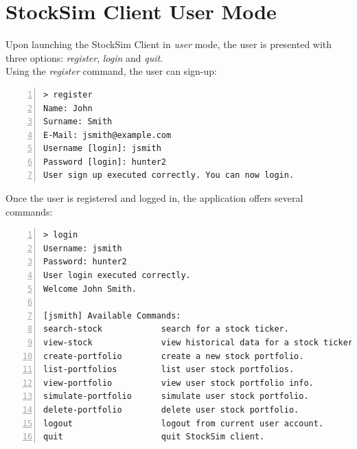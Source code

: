 \section{StockSim Client User Mode}
Upon launching the StockSim Client in \textit{user} mode, the user is presented
with three options: \textit{register}, \textit{login} and \textit{quit}.\\
Using the \textit{register} command, the user can sign-up:
\vspace{0.2cm}
\begin{lstlisting}[basicstyle=\footnotesize\ttfamily,language={},numbers=left,keepspaces=true,tabsize=4,
numberstyle=\footnotesize,numbersep=8pt,frame=single]
> register
Name: John
Surname: Smith
E-Mail: jsmith@example.com
Username [login]: jsmith
Password [login]: hunter2
User sign up executed correctly. You can now login.
\end{lstlisting}
\vspace{-0.5cm}
Once the user is registered and logged in, the application offers several commands:
\vspace{0.2cm}
\begin{lstlisting}[basicstyle=\footnotesize\ttfamily,language={},numbers=left,keepspaces=true,tabsize=4,
numberstyle=\footnotesize,numbersep=8pt,frame=single]
> login
Username: jsmith
Password: hunter2
User login executed correctly.
Welcome John Smith.

[jsmith] Available Commands:
search-stock			search for a stock ticker.              
view-stock				view historical data for a stock ticker.
create-portfolio		create a new stock portfolio.           
list-portfolios			list user stock portfolios.             
view-portfolio			view user stock portfolio info.         
simulate-portfolio		simulate user stock portfolio.          
delete-portfolio		delete user stock portfolio.            
logout					logout from current user account.       
quit					quit StockSim client.   
\end{lstlisting}
\vspace{-0.4cm}
